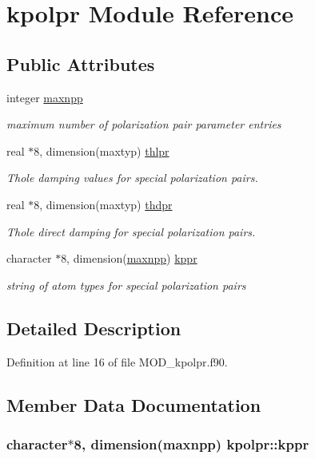 \hypertarget{classkpolpr}{\section{kpolpr Module Reference}
\label{classkpolpr}
}
\subsection*{Public Attributes}
\begin{DoxyCompactItemize}
\item 
integer \hyperlink{classkpolpr_adbc49463af8a226063a26ea44a9051d0}{maxnpp}
\begin{DoxyCompactList}\small\item\em maximum number of polarization pair parameter entries \end{DoxyCompactList}\item 
real $\ast$8, dimension(maxtyp) \hyperlink{classkpolpr_a582375b52442e078d9ce8796a765bc5c}{thlpr}
\begin{DoxyCompactList}\small\item\em Thole damping values for special polarization pairs. \end{DoxyCompactList}\item 
real $\ast$8, dimension(maxtyp) \hyperlink{classkpolpr_ade1cdc47155175ca210ef8f8c618c2de}{thdpr}
\begin{DoxyCompactList}\small\item\em Thole direct damping for special polarization pairs. \end{DoxyCompactList}\item 
character $\ast$8, dimension(\hyperlink{classkpolpr_adbc49463af8a226063a26ea44a9051d0}{maxnpp}) \hyperlink{classkpolpr_a70e3268a7dc58fc18c804a356bf27e93}{kppr}
\begin{DoxyCompactList}\small\item\em string of atom types for special polarization pairs \end{DoxyCompactList}\end{DoxyCompactItemize}


\subsection{Detailed Description}


Definition at line 16 of file M\-O\-D\-\_\-kpolpr.\-f90.



\subsection{Member Data Documentation}
\hypertarget{classkpolpr_a70e3268a7dc58fc18c804a356bf27e93}{
\subsubsection[{kppr}]{\setlength{\rightskip}{0pt plus 5cm}character$\ast$8, dimension({\bf maxnpp}) kpolpr\-::kppr}}\label{classkpolpr_a70e3268a7dc58fc18c804a356bf27e93}


